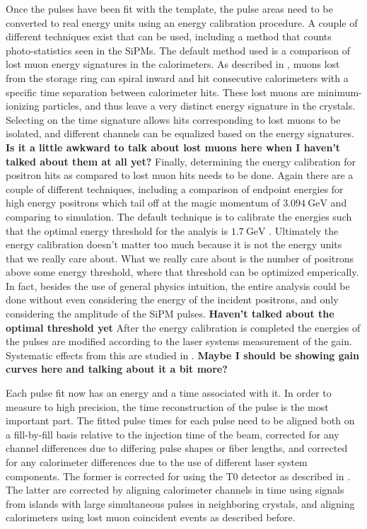 Once the pulses have been fit with the template, the pulse areas need to be converted to real energy units using an energy calibration procedure. A couple of different techniques exist that can be used, including a method that counts photo-statistics seen in the SiPMs. The default method used is a comparison of lost muon energy signatures in the calorimeters. As described in , muons lost from the storage ring can spiral inward and hit consecutive calorimeters with a specific time separation between calorimeter hits. These lost muons are minimum-ionizing particles, and thus leave a very distinct energy signature in the crystals. Selecting on the time signature allows hits corresponding to lost muons to be isolated, and different channels can be equalized based on the energy signatures. \textbf{Is it a little awkward to talk about lost muons here when I haven't talked about them at all yet?} Finally, determining the energy calibration for positron hits as compared to lost muon hits needs to be done. Again there are a couple of different techniques, including a comparison of endpoint energies for high energy positrons which tail off at the magic momentum of $\SI{3.094}{\GeV}$ and comparing to simulation. The default technique is to calibrate the energies such that the optimal energy threshold for the \wa analyis is $\SI{1.7}{\GeV}$ \cite{AFThesis}. Ultimately the energy calibration doesn't matter too much because it is not the energy units that we really care about. What we really care about is the number of positrons above some energy threshold, where that threshold can be optimized emperically. In fact, besides the use of general physics intuition, the entire \wa analysis could be done without even considering the energy of the incident positrons, and only considering the amplitude of the SiPM pulses. \textbf{Haven't talked about the optimal threshold yet} After the energy calibration is completed the energies of the pulses are modified according to the laser systems measurement of the gain. Systematic effects from this are studied in . \textbf{Maybe I should be showing gain curves here and talking about it a bit more?}


Each pulse fit now has an energy and a time associated with it. In order to measure \wa to high precision, the time reconstruction of the pulse is the most important part. The fitted pulse times for each pulse need to be aligned both on a fill-by-fill basis relative to the injection time of the beam, corrected for any channel differences due to differing pulse shapes or fiber lengths, and corrected for any calorimeter differences due to the use of different laser system components. The former is corrected for using the T0 detector as described in . The latter are corrected by aligning calorimeter channels in time using signals from islands with large simultaneous pulses in neighboring crystals, and aligning calorimeters using lost muon coincident events as described before.









